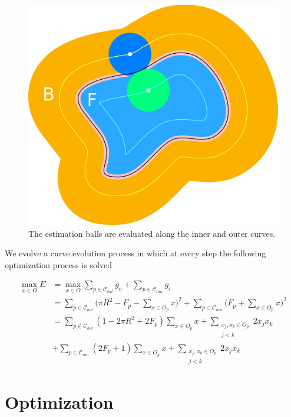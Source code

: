 \begin{figure}[h!]\label{fig:integral}
\center
\includegraphics[scale=0.25]{figures/appendix-max-energy/integral-2.png}
\caption{The estimation balls are evaluated along the inner and outer curves.}
\end{figure}


We evolve a curve evolution process in which at every step the following optimization process is solved

\begin{align}\label{eq:max-energy}
	\max_{x \in O}{E} &= \max_{x \in O} \sum_{p \in \mathcal{C}_{out}}{g_o} + \sum_{p \in \mathcal{C}_{inn}}{g_i}\\\nonumber 
	&=\sum_{p \in \mathcal{C}_{out}}{ \big( \pi R^2 - F_p - \sum_{x \in O_p}{x}\big)^2} + \sum_{p \in \mathcal{C}_{inn}}{ \big( F_p + \sum_{x \in O_p}{x}\big)^2}\\\nonumber
	&= \sum_{p \in \mathcal{C}_{out}}{ (1 - 2\pi R^2 + 2F_p) \sum_{x \in O_p}{x} + \sum_{ \substack{ x_j,x_k \in O_p \\ j < k}}{2x_jx_k}}\\\nonumber
	&+ \sum_{p \in \mathcal{C}_{inn}}{(2F_p + 1)\sum_{x \in O_p}{x} + \sum_{\substack{ x_j,x_k \in O_p \\ j < k}}{2x_jx_k}}	
\end{align}


\section{Optimization}

